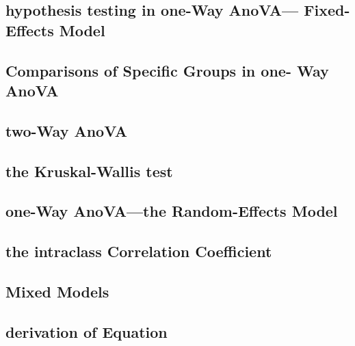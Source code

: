 \documentclass[12pt,]{article}
\begin{document}
\hypertarget{hypothesis-testing-in-one-way-anova-fixed-effects-model}{%
\subsection{hypothesis testing in one-Way AnoVA--- Fixed-Effects
Model}\label{hypothesis-testing-in-one-way-anova-fixed-effects-model}}

\hypertarget{comparisons-of-specific-groups-in-one--way-anova}{%
\subsection{Comparisons of Specific Groups in one- Way
AnoVA}\label{comparisons-of-specific-groups-in-one--way-anova}}

\hypertarget{two-way-anova}{%
\subsection{two-Way AnoVA}\label{two-way-anova}}

\hypertarget{the-kruskal-wallis-test}{%
\subsection{the Kruskal-Wallis test}\label{the-kruskal-wallis-test}}

\hypertarget{one-way-anovathe-random-effects-model}{%
\subsection{one-Way AnoVA---the Random-Effects
Model}\label{one-way-anovathe-random-effects-model}}

\hypertarget{the-intraclass-correlation-coefficient}{%
\subsection{the intraclass Correlation
Coefficient}\label{the-intraclass-correlation-coefficient}}

\hypertarget{mixed-models}{%
\subsection{Mixed Models}\label{mixed-models}}

\hypertarget{derivation-of-equation}{%
\subsection{derivation of Equation}\label{derivation-of-equation}}
\end{document}
